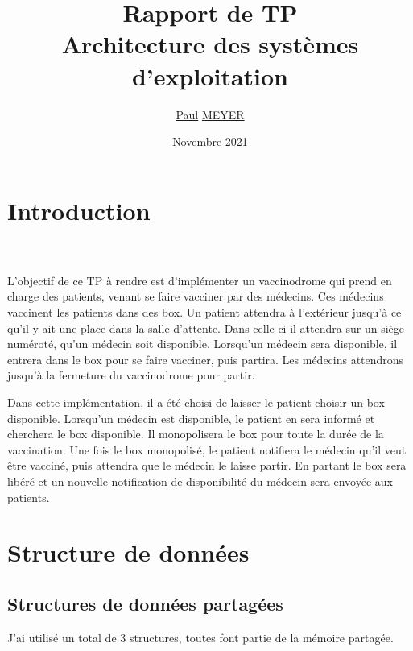 \documentclass[a4paper]{article}
\title{Rapport de TP \\ Architecture des systèmes d'exploitation}
\author{\underline{Paul} \underline{MEYER}}
\date{Novembre 2021}
\makeatletter
\newenvironment{expl}{%
  \begin{list}{}{%
    \small\itshape%
    \topsep\z@%
    \listparindent0pt%
    \parsep0.75\baselineskip%
    \setlength{\leftmargin}{20mm}%
    \setlength{\rightmargin}{20mm}%
  }
    \item[]}%
    {\end{list}}
\makeatother
\begin{document}
  \maketitle

  \tableofcontents

  \listoffigures

  \newpage

  \section{Introduction}
  \\~\\
  L'objectif de ce TP à rendre est d'implémenter un vaccinodrome qui prend en charge des patients, venant se faire
  vacciner par des médecins. Ces médecins vaccinent les patients dans des box. Un patient attendra à l'extérieur jusqu'à
  ce qu'il y ait une place dans la salle d'attente. Dans celle-ci il attendra sur un siège numéroté, qu'un médecin soit disponible. Lorsqu'un médecin sera disponible, il entrera dans le box pour se faire vacciner, puis partira. Les médecins attendrons jusqu'à la fermeture du vaccinodrome pour partir.

  Dans cette implémentation, il a été choisi de laisser le patient choisir un box disponible.
  Lorsqu'un médecin est disponible, le patient en sera informé et cherchera le box disponible.
  Il monopolisera le box pour toute la durée de la vaccination. Une fois le box monopolisé, le patient notifiera le médecin qu'il veut être vacciné, puis attendra que le médecin le laisse partir. En partant le box sera libéré et un nouvelle notification de disponibilité du médecin sera envoyée aux patients.
  \newpage
  \section{Structure de données}

  \subsection{Structures de données partagées}\label{sec-shm}

  J'ai utilisé un total de 3 structures, toutes font partie de la mémoire partagée.
\end{document}
